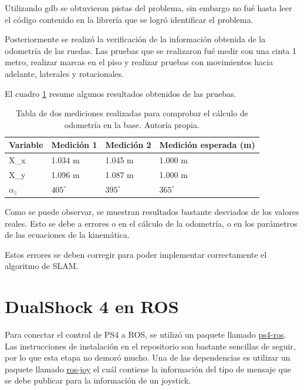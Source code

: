 Utilizando gdb se obtuvieron pistas del problema, sin embargo no fué hasta leer el código contenido en la librería que se logró identificar el problema.

Posteriormente se realizó la verificación de la información obtenida de la odometría de las ruedas. Las pruebas que se realizaron fué medir con una cinta 1 metro, realizar marcas en el piso y realizar pruebas con movimientos hacia adelante, laterales y rotacionales.

El cuadro \ref{T:odometria} resume algunos resultados obtenidos de las pruebas.

\begin{table}[H]
\caption{Tabla de dos mediciones realizadas para comprobar el cálculo de odometría en la base. Autoría propia.}
\begin{tabular}{|l|l|l|l|}
\hline
Variable                 & Medición 1                                & Medición 2                                & Medición esperada (m)                     \\ \hline
X\_x                     & 1.034 m                                   & 1.045 m                                   & 1.000 m                                   \\ \hline
X\_y                     & 1.096 m                                   & 1.087 m                                   & 1.000 m                                   \\ \hline
$\alpha_z$ & $405^\circ$ & $395^\circ$ & $365^\circ$ \\ \hline
\end{tabular}
\label{T:odometria}
\end{table}

Como se puede observar, se muestran resultados bastante desviados de los valores reales. Esto se debe a errores o en el cálculo de la odometría, o en los parámetros de las ecuaciones de la kinemática.

Estos errores se deben corregir para poder implementar correctamente el algoritmo de SLAM.

\section{DualShock 4 en ROS}

Para conectar el control de PS4 a ROS, se utilizó un paquete llamado \href{https://github.com/solbach/ps4-ros}{ps4-ros}. Las instrucciones de instalación en el repositorio son bastante sencillas de seguir, por lo que esta etapa no demoró mucho. Una de las dependencias es utilizar un paquete llamado \href{http://wiki.ros.org/joy}{ros-joy} el cuál contiene la información del tipo de mensaje que se debe publicar para la información de un joystick.

